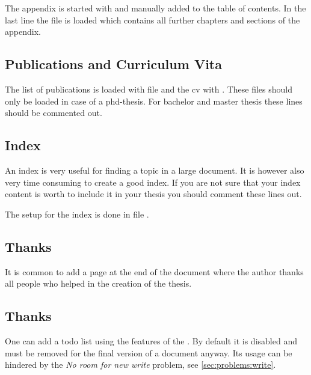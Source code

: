 The appendix is started with  and manually added to the table of contents. In the last line the file  is loaded which contains all further chapters and sections of the appendix.
%

\subsection{Publications and Curriculum Vita}
The list of publications is loaded with file  and the cv with . These files should only be loaded in case of a phd-thesis. For bachelor and master thesis these lines should be commented out.
%


\subsection{Index}
An index is very useful for finding a topic in a large document. It is however also very time consuming to create a good index. If you are not sure that your index content is worth to include it in your thesis you should comment these lines out.

The setup for the index is done in file .


\subsection{Thanks}
It is common to add a page at the end of the document where the author thanks all people who helped in the creation of the thesis. 


\subsection{Thanks}
One can add a todo list using the features of the . 
By default it is disabled and must be removed for the final version of a document anyway. Its usage can be hindered by the \textit{No room for new write} problem, see \cref{sec:problems:write}.

